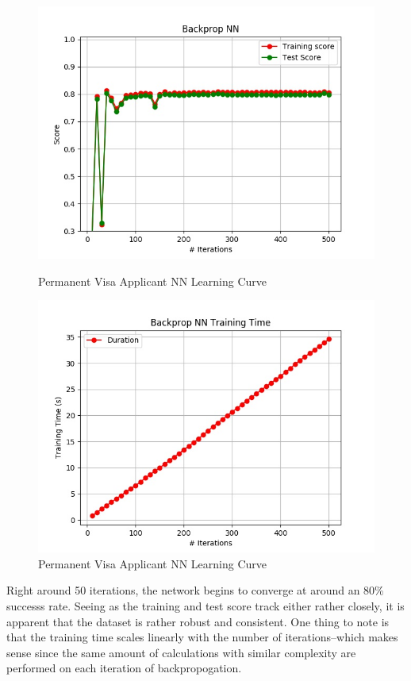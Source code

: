 \documentclass[h]{article}
\begin{document}
 \begin{figure}[H]
      \includegraphics[width=1\textwidth,keepaspectratio]{backprop_nn_1.jpg} 
      \caption*{Permanent Visa Applicant NN Learning Curve} 
   \endminipage\hfill
      \includegraphics[width=1\textwidth,keepaspectratio]{backprop_nn_time_1.jpg} 
      \caption*{Permanent Visa Applicant NN Learning Curve} 
   \endminipage\hfill
\end{figure}

Right around 50 iterations, the network begins to converge at around an 80\% 
successs rate.  Seeing as the training and test score track either rather 
closely, it is apparent that the dataset is rather robust and consistent.  One 
thing to note is that the training time scales linearly with the number of 
iterations--which makes sense since the same amount of calculations with similar 
complexity are performed on each iteration of backpropogation.  
\end{document}
